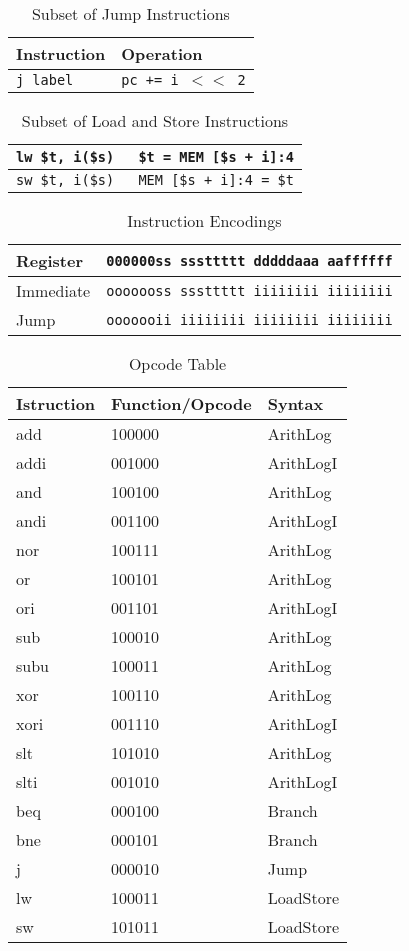 \documentclass[12pt]{report}
\begin{document}
\begin{longtable}{|p{5cm}|p{7cm}|}
\caption{Subset of Jump Instructions}\\
\hline
\textbf{Instruction}&\textbf{Operation}\\\hline
\texttt{j label}&\texttt{pc += i $<<$ 2}\\\hline
\end{longtable}


\begin{longtable}{|p{5cm}|p{7cm}|}
\caption{Subset of Load and Store Instructions}\\
\hline
\texttt{lw \$t, i(\$s) }&\texttt{\$t = MEM [\$s + i]:4}\\\hline
\texttt{sw \$t, i(\$s)}&\texttt{MEM [\$s + i]:4 = \$t}\\\hline
\end{longtable}

\begin{longtable}{|p{3.5cm}|p{8.5cm}|}
\caption{Instruction Encodings}\\\hline
Register &\texttt{000000ss sssttttt dddddaaa aaffffff}\\\hline
Immediate &\texttt{ooooooss sssttttt iiiiiiii iiiiiiii}\\\hline
Jump &\texttt{ooooooii iiiiiiii iiiiiiii iiiiiiii}\\\hline
\end{longtable}

\begin{longtable}{|p{3.9cm}|p{3.9cm}|p{3.9cm}|}
\caption{Opcode Table}\\\hline
Istruction&Function/Opcode&Syntax\\\hline
add &100000& ArithLog\\\hline
addi &001000 &ArithLogI\\\hline
and &100100& ArithLog\\\hline
andi &001100& ArithLogI\\\hline
nor &100111 &ArithLog\\\hline
or &100101 &ArithLog\\\hline
ori &001101 &ArithLogI\\\hline
sub &100010 &ArithLog\\\hline
subu &100011 &ArithLog\\\hline
xor &100110 &ArithLog\\\hline
xori &001110& ArithLogI\\\hline
slt&101010&ArithLog\\\hline
slti&001010&ArithLogI\\\hline
beq&000100&Branch\\\hline
bne&000101&Branch\\\hline
j&000010&Jump\\\hline
lw&100011&LoadStore\\\hline
sw&101011&LoadStore\\\hline
\end{longtable}
\end{document}
